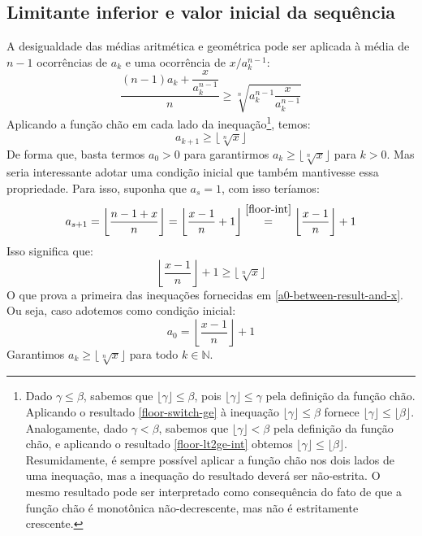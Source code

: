 \subsection*{Limitante inferior e valor inicial da sequência}

A desigualdade das médias aritmética e geométrica
pode ser aplicada à média de $n - 1$ ocorrências de $a_k$
e uma ocorrência de $x/a_k^{n-1}$:
\begin{equation}
  \dfrac{(n-1) a_k + \dfrac{x}{a_k^{n-1}}}{n} \ge
  \sqrt[n]{a_k^{n-1} \dfrac{x}{a_k^{n-1}}}
\end{equation}
Aplicando a função chão em cada lado da inequação\footnote{
  Dado $\gamma \le \beta$, sabemos que
  $\lfloor \gamma \rfloor \le \beta$,
  pois $\lfloor \gamma \rfloor \le \gamma$
  pela definição da função chão.
  Aplicando o resultado \eqref{floor-switch-ge}
  à inequação $\lfloor \gamma \rfloor \le \beta$
  fornece $\lfloor \gamma \rfloor \le \lfloor \beta \rfloor$.
  Analogamente, dado $\gamma < \beta$,
  sabemos que $\lfloor \gamma \rfloor < \beta$
  pela definição da função chão,
  e aplicando o resultado \eqref{floor-lt2ge-int}
  obtemos $\lfloor \gamma \rfloor \le \lfloor \beta \rfloor$.
  Resumidamente,
  é sempre possível aplicar a função chão
  nos dois lados de uma inequação,
  mas a inequação do resultado deverá ser não-estrita.
  O mesmo resultado pode ser interpretado
  como consequência do fato
  de que a função chão é monotônica não-decrescente,
  mas não é estritamente crescente.
},
temos:
\begin{equation}\label{amgm-min-ak+1}
  a_{k+1} \ge \lfloor \sqrt[n]{x} \rfloor
\end{equation}
De forma que, basta termos $a_0 > 0$
para garantirmos $a_k \ge \lfloor \sqrt[n]{x} \rfloor$ para $k > 0$.
Mas seria interessante adotar uma condição inicial
que também mantivesse essa propriedade.
Para isso, suponha que $a_s = 1$, com isso teríamos:
\[
  a_{s+1}
  = \left\lfloor \dfrac{n - 1 + x}{n} \right\rfloor
  = \left\lfloor \dfrac{x - 1}{n} + 1 \right\rfloor
  \stackfirst{\eqref{floor-int}}{=}
    \left\lfloor \dfrac{x - 1}{n} \right\rfloor + 1
\]
Isso significa que:
\begin{equation}\label{a0-not-below-result}
  \left\lfloor \dfrac{x - 1}{n} \right\rfloor + 1
  \ge \lfloor \sqrt[n]{x} \rfloor
\end{equation}
O que prova a primeira das inequações
fornecidas em \eqref{a0-between-result-and-x}.
Ou seja, caso adotemos como condição inicial:
\[
  a_0 = \left\lfloor \dfrac{x - 1}{n} \right\rfloor + 1
\]
Garantimos $a_k \ge \lfloor \sqrt[n]{x} \rfloor$
para todo $k \in \mathds{N}$.
